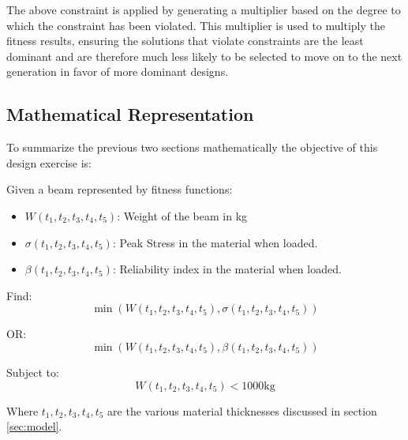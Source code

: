 The above constraint is applied by generating a multiplier based on the degree to which the constraint has been violated. This multiplier is used to multiply the fitness results, ensuring the solutions that violate constraints are the least dominant and are therefore much less likely to be selected to move on to the next generation in favor of more dominant designs.

\subsection{Mathematical Representation}
To summarize the previous two sections mathematically the objective of this design exercise is: 

Given a beam represented by fitness functions: 

\begin{itemize}
  \item $W(t_1, t_2, t_3, t_4, t_5)$: Weight of the beam in kg
  \item $\sigma(t_1, t_2, t_3, t_4, t_5)$: Peak Stress in the material when loaded. 
  \item $\beta(t_1, t_2, t_3, t_4, t_5)$: Reliability index in the material when loaded. 
\end{itemize}

Find: 
	$$\min\left(W(t_1, t_2, t_3, t_4, t_5), \sigma(t_1, t_2, t_3, t_4, t_5)\right)$$

OR: 
	$$\min\left(W(t_1, t_2, t_3, t_4, t_5), \beta(t_1, t_2, t_3, t_4, t_5)\right)$$

Subject to:
	$$W(t_1, t_2, t_3, t_4, t_5) < 1000 \text{kg}$$

Where
	$t_1, t_2, t_3, t_4, t_5$ are the various material thicknesses discussed in section \ref{sec:model}. 

